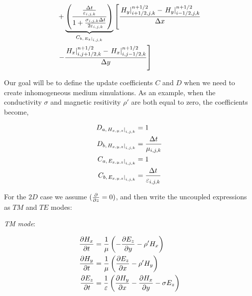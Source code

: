 \documentclass[12pt]{article}
\begin{document}
\begin{subequations}
\begin{align}
                                              & + \underbrace{\left(
      \frac{\frac{\Delta t}{\varepsilon_{i,j,k}}}{1 + \frac{\sigma_{i,j,k} \Delta t}{2 \varepsilon_{i,j,k}}}
      \right)}_{C_{b,\left. E_{z} \right|_{i,j,k}}} \left[
    \frac{\left. H_y \right|^{n+1/2}_{i+1/2,j,k} - \left. H_y \right|^{n+1/2}_{i-1/2,j,k}}{\Delta x} \right. \nonumber                                    \\
                                              & \left. - \frac{\left. H_x \right|^{n+1/2}_{i,j+1/2,k} - \left. H_x \right|^{n+1/2}_{i,j-1/2,k}}{\Delta y}
    \right] \label{eq:final_Ez_3D}
  \end{align}
\end{subequations}

Our goal will be to define the update coefficients $C$ and $D$ when we need to create inhomogeneous medium simulations. As an example, when the conductivity $\sigma$ and magnetic resitivity $\rho'$ are both equal to zero, the coefficients become,

\begin{subequations}
  \begin{align}
    D_{a,\left. H_{x,y,z} \right|_{i,j,k}} ={} & 1                           \\
    D_{b,\left. H_{x,y,z} \right|_{i,j,k}} ={} & \frac{\Delta t}{\mu_{i,j,k}} \\
    C_{a,\left. E_{x,y,z} \right|_{i,j,k}} ={} & 1                           \\
    C_{b,\left. E_{x,y,z} \right|_{i,j,k}} ={} & \frac{\Delta t}{\varepsilon_{i,j,k}} \\
  \end{align}
  \label{eq:coefficients}
\end{subequations}

For the $2D$ case we assume $(\pdv{z} = 0)$, and then write the uncoupled expressions as $TM$ and $TE$ modes:

\textit{TM mode}:

\begin{subequations}
  \begin{align}
    \pdv{H_x}{t} ={} & \frac{1}{\mu}\left(-\pdv{E_z}{y}-\rho' H_{x}\right)     \label{eq:H_x_TM}          \\
    \pdv{H_y}{t} ={} & \frac{1}{\mu}\left(\pdv{E_z}{x}-\rho' H_{y}\right)    \label{eq:H_y_TM}            \\
    \pdv{E_z}{t} ={} & \frac{1}{\varepsilon}\left(\pdv{H_y}{x}-\pdv{H_x}{y}-\sigma E_{z}\right) \label{eq:E_z_TM}
  \end{align}
  \label{eq:TM mode}
\end{subequations}
\end{document}
